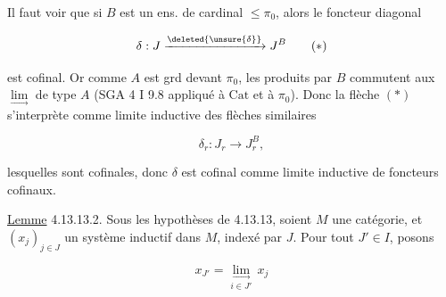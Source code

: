 
Il faut voir que si $B$ est un ens. de cardinal $\leq\pi_0$, alors le foncteur diagonal

\[
\delta:J\xrightarrow{\deleted{\unsure{\delta}}}J^B \tag*{$(*)$}
\]

est cofinal. Or comme $A$ est grd devant $\pi_0$,  les produits  par $B$ commutent aux $\underset{\longrightarrow}{\lim}$ de type $A$ (SGA 4 I 9.8 appliqué à $\mathrm{Cat}$ et à $\pi_0$). Donc la flèche $(*)$  s'interprète comme limite inductive des flèches similaires

\[
\delta_r:J_r\longrightarrow J_r^B, \tag*{$(**)$}
\]

lesquelles sont cofinales, donc $\delta$ est cofinal comme limite inductive de foncteurs cofinaux.

\uline{Lemme} 4.13.13.2. Sous les hypothèses de 4.13.13, soient $M$ une catégorie, et $(x_j)_{j\in J}$  un système inductif  dans $M$, indexé par $J$. Pour tout $J'\in I$, posons

\[
x_{J'}=\underset{i\in J'}{\underset{\longrightarrow}{\lim}}\,x_j
\]

